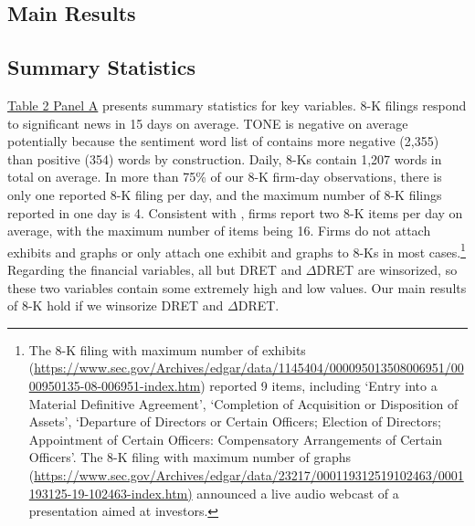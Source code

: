 \documentclass[letterpaper,12pt]{article}
\begin{document}
\begin{spacing}{1.5}
\section{Main Results}
\subsection{Summary Statistics}
\noindent \hyperref[T2PA]{Table 2 Panel A} presents summary statistics for key variables. 
8-K filings respond to significant news in 15 days on average. TONE is negative on average potentially because the sentiment word list of  contains more negative (2,355) than positive (354) words by construction. Daily, 8-Ks contain 1,207 words in total on average. In more than 75\% of our 8-K firm-day observations, there is only one reported 8-K filing per day, and the maximum number of 8-K filings reported in one day is 4. Consistent with , firms report two 8-K items per day on average, with the maximum number of items being 16. Firms do not attach exhibits and graphs or only attach one exhibit and graphs to 8-Ks in most cases.\footnote{The 8-K filing with maximum number of exhibits (\url{https://www.sec.gov/Archives/edgar/data/1145404/000095013508006951/0000950135-08-006951-index.htm}) reported 9 items, including `Entry into a Material Definitive Agreement', `Completion of Acquisition or Disposition of Assets', `Departure of Directors or Certain Officers; Election of Directors; Appointment of Certain Officers: Compensatory Arrangements of Certain Officers'. The 8-K filing with maximum number of graphs (\url{https://www.sec.gov/Archives/edgar/data/23217/000119312519102463/0001193125-19-102463-index.htm)} announced a live audio webcast of a presentation aimed at investors.} Regarding the financial variables, all but DRET and $\Delta$DRET are winsorized, so these two variables contain some extremely high and low values. Our main results of 8-K hold if we winsorize DRET and $\Delta$DRET.


\end{spacing}
\end{document}
